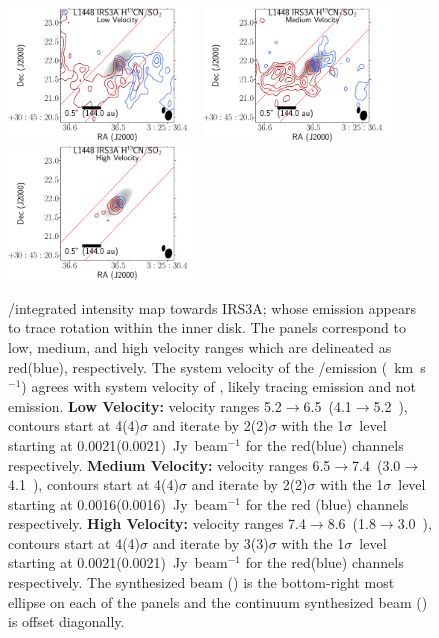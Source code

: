 \begin{figure}[H]
\begin{center}
   \includegraphics[width=0.45\textwidth]{img/L1448IRS3B_H13CN_image_taper1000k__-irs3alow_irs3a.pdf}
   \includegraphics[width=0.45\textwidth]{img/L1448IRS3B_H13CN_image_taper1000k__-irs3amed_irs3a.pdf}
   \includegraphics[width=0.45\textwidth]{img/L1448IRS3B_H13CN_image_taper1000k__-irs3ahigh_irs3a.pdf} %
\end{center}
   \caption{\htcn/\sot\space integrated intensity map towards IRS3A; whose emission appears to trace rotation within the inner disk. The panels correspond to low, medium, and high velocity ranges which are delineated as red(blue), respectively. The system velocity of the \htcn/\sot\space emission (~km~s$^{-1}$) agrees with system velocity of \cso\space, likely tracing \htcn\space emission and not \sot\space emission. \textbf{Low Velocity:} velocity ranges 5.2$\rightarrow$6.5~\kms (4.1$\rightarrow$5.2~\kms), contours start at 4(4)$\sigma$ and iterate by 2(2)$\sigma$ with the 1$\sigma$~level starting at 0.0021(0.0021)~Jy~beam$^{-1}$ for the red(blue) channels respectively. \textbf{Medium Velocity:}  velocity ranges 6.5$\rightarrow$7.4~\kms (3.0$\rightarrow$4.1~\kms), contours start at 4(4)$\sigma$ and iterate by 2(2)$\sigma$ with the 1$\sigma$~level starting at 0.0016(0.0016)~Jy~beam$^{-1}$ for the red (blue) channels respectively. \textbf{High Velocity:} velocity ranges 7.4$\rightarrow$8.6~\kms (1.8$\rightarrow$3.0~\kms), contours start at 4(4)$\sigma$ and iterate by 3(3)$\sigma$ with the 1$\sigma$~level starting at 0.0021(0.0021)~Jy~beam$^{-1}$ for the red(blue) channels respectively. The \htcn\space synthesized beam (\htcnbeam) is the bottom-right most ellipse on each of the panels and the continuum synthesized beam (\contbeam) is offset diagonally.}\label{fig:irs3ah13cnmoment}
\end{figure}



